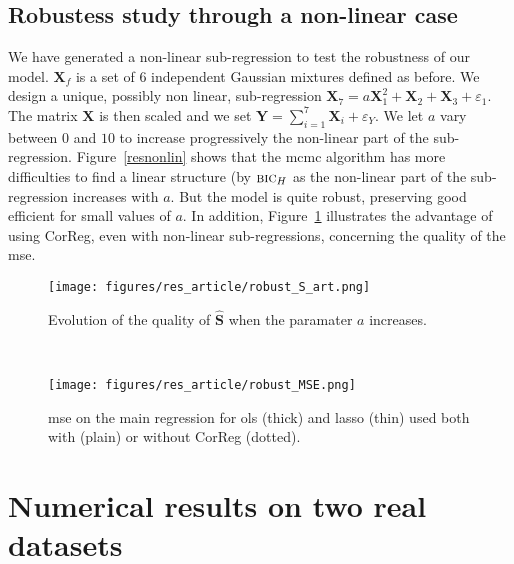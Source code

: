 \documentclass[11pt,a4paper]{article}
\begin{document}
\subsection{Robustess study through a non-linear case} \label{resrobust}


We have generated a non-linear sub-regression to test the robustness of our model. $\boldsymbol{X}_f$ is a set of 6 independent Gaussian mixtures defined as before. We design a unique, possibly non linear, sub-regression $\boldsymbol{X}_7=a\boldsymbol{X}_1^2+\boldsymbol{X}_2+\boldsymbol{X}_3+ \varepsilon_1$. The matrix $\boldsymbol{X}$ is then scaled and we set $\boldsymbol{Y}=\sum_{i=1}^7\boldsymbol{X}_i+\varepsilon_Y$. We let $a$ vary between $0$ and $10$ to increase progressively the non-linear part of the sub-regression.
Figure~\ref{resnonlin} shows that the {\sc mcmc} algorithm has more difficulties to find a linear structure (by  $\mbox{{\sc bic}}_H$ as the non-linear part of the sub-regression increases with $a$. But the model is quite robust, preserving good efficient for small values of $a$.
In addition, Figure~\ref{MSEnonlin} illustrates the advantage of using {\sc CorReg}, even with non-linear sub-regressions, concerning the quality of the {\sc mse}.

 \begin{figure}[h!] 
	\begin{minipage}[l]{.48\linewidth}
			\texttt{[image: figures/res\_article/robust\_S\_art.png]} 
			\caption{Evolution of the quality of $\hat{\boldsymbol{S}}$ when the paramater $a$ increases.}\label{resnonlin}
	\end{minipage} \
   \begin{minipage}[r]{.48\linewidth}
			\texttt{[image: figures/res\_article/robust\_MSE.png]} 
			\caption{{\sc mse} on the main regression for {\sc ols} (thick) and {\sc lasso} (thin) used both with (plain) or without {\sc CorReg} (dotted).}\label{MSEnonlin}
   \end{minipage}
\end{figure}


	\FloatBarrier	
\section{Numerical results on two real datasets} \label{sectionrealcase}
\end{document}
